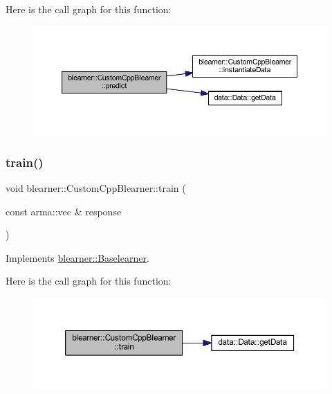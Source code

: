 Here is the call graph for this function\+:
\nopagebreak
\begin{figure}[H]
\begin{center}
\leavevmode
\includegraphics[width=350pt]{classblearner_1_1_custom_cpp_blearner_af2326171640e94c3a00f813781710208_cgraph}
\end{center}
\end{figure}
\mbox{\label{classblearner_1_1_custom_cpp_blearner_aa71b777d7092a3d9b47a9bed125eb0f9}} 
\subsubsection{\texorpdfstring{train()}{train()}}
{\footnotesize\ttfamily void blearner\+::\+Custom\+Cpp\+Blearner\+::train (\begin{DoxyParamCaption}\item[{const arma\+::vec \&}]{response }\end{DoxyParamCaption})\hspace{0.3cm}{\ttfamily [virtual]}}



Implements \mbox{\hyperlink{classblearner_1_1_baselearner_a40e03ad070b9a03aae706d9ee8094b80}{blearner\+::\+Baselearner}}.

Here is the call graph for this function\+:
\nopagebreak
\begin{figure}[H]
\begin{center}
\leavevmode
\includegraphics[width=350pt]{classblearner_1_1_custom_cpp_blearner_aa71b777d7092a3d9b47a9bed125eb0f9_cgraph}
\end{center}
\end{figure}


